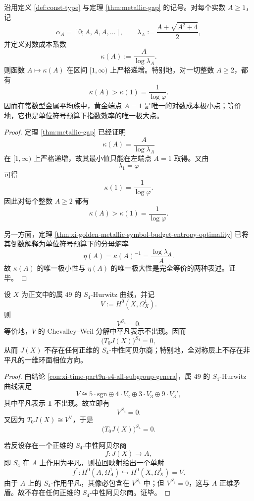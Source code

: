 \begin{theorem}[黄金分支在金属平均族中的对数成本极小性]\label{thm:xi-time-part9xf-golden-metallic-logcost-minimizer}
沿用定义 \ref{def:const-type} 与定理 \ref{thm:metallic-gap} 的记号。对每个实数 \(A\ge 1\)，记
\[
\alpha_A=[0;A,A,A,\dots],
\qquad
\lambda_A:=\frac{A+\sqrt{A^2+4}}{2},
\]
并定义对数成本系数
\[
\kappa(A):=\frac{A}{\log\lambda_A}.
\]
则函数 \(A\mapsto \kappa(A)\) 在区间 \([1,\infty)\) 上严格递增。特别地，对一切整数 \(A\ge 2\)，都有
\[
\kappa(A)>\kappa(1)=\frac{1}{\log\varphi}.
\]
因而在常数型金属平均族中，黄金端点 \(A=1\) 是唯一的对数成本极小点；等价地，它也是单位符号预算下指数效率的唯一极大点。
\end{theorem}
\begin{proof}
定理 \ref{thm:metallic-gap} 已经证明
\[
\kappa(A)=\frac{A}{\log\lambda_A}
\]
在 \([1,\infty)\) 上严格递增，故其最小值只能在左端点 \(A=1\) 取得。又由
\[
\lambda_1=\varphi
\]
可得
\[
\kappa(1)=\frac{1}{\log\varphi}.
\]
因此对每个整数 \(A\ge 2\) 都有
\[
\kappa(A)>\kappa(1)=\frac{1}{\log\varphi}.
\]

另一方面，定理 \ref{thm:xi-golden-metallic-symbol-budget-entropy-optimality} 已将其倒数解释为单位符号预算下的分母熵率
\[
\eta(A)=\kappa(A)^{-1}=\frac{\log\lambda_A}{A}.
\]
故 \(\kappa(A)\) 的唯一极小性与 \(\eta(A)\) 的唯一极大性是完全等价的两种表述。证毕。
\end{proof}

\begin{theorem}\label{thm:xi-time-part9xf-s4-neutral-layer-vanishing}
设 \(X\) 为正文中的属 \(49\) 的 \(S_4\)-Hurwitz 曲线，并记
\[
V:=H^0(X,\Omega_X^1).
\]
则
\[
V^{S_4}=0.
\]
等价地，\(V\) 的 Chevalley--Weil 分解中平凡表示不出现。因而
\[
\bigl(T_0J(X)\bigr)^{S_4}=0,
\]
从而 \(J(X)\) 不存在任何正维的 \(S_4\)-中性阿贝尔商；特别地，全对称层上不存在非平凡的一维环面相位方向。
\end{theorem}
\begin{proof}
由结论 \ref{con:xi-time-part9n-s4-all-subgroup-genera}，属 \(49\) 的 \(S_4\)-Hurwitz 曲线满足
\[
V
\cong
5\cdot \mathrm{sgn}\oplus 4\cdot V_2\oplus 3\cdot V_3\oplus 9\cdot V_3',
\]
其中平凡表示 \(\mathbf 1\) 不出现。故立即有
\[
V^{S_4}=0.
\]
又因为 \(T_0J(X)\cong V^\vee\)，于是
\[
\bigl(T_0J(X)\bigr)^{S_4}=0.
\]

若反设存在一个正维的 \(S_4\)-中性阿贝尔商
\[
f:J(X)\to A,
\]
即 \(S_4\) 在 \(A\) 上作用为平凡，则拉回映射给出一个单射
\[
f^*:H^0(A,\Omega_A^1)\hookrightarrow H^0(X,\Omega_X^1)=V.
\]
由于 \(A\) 上的 \(S_4\)-作用平凡，其像必包含在 \(V^{S_4}\) 中；但 \(V^{S_4}=0\)，这与 \(A\) 正维矛盾。故不存在任何正维的 \(S_4\)-中性阿贝尔商。证毕。
\end{proof}

